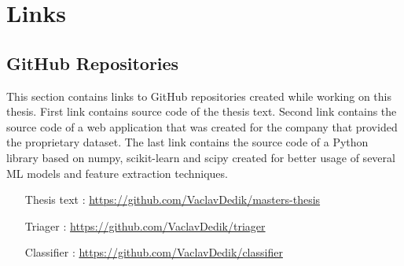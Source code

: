 \documentclass[nopalatino,nolot,nolof,color]{fithesis3}
\begin{document}
 \chapter{Links}
 \label{appendix:links}

 \section{GitHub Repositories}

 This section contains links to GitHub repositories created while working on this thesis. First link contains source code of the thesis text. Second link contains the source code of a web application that was created for the company that provided the proprietary dataset. The last link contains the source code of a Python library based on numpy, scikit-learn and scipy created for better usage of several ML models and feature extraction techniques.

 \begin{itemize}
   \item[Thesis text]: \url{https://github.com/VaclavDedik/masters-thesis}
   \item[Triager]: \url{https://github.com/VaclavDedik/triager}
   \item[Classifier]: \url{https://github.com/VaclavDedik/classifier}
 \end{itemize}

 \todos
\end{document}
